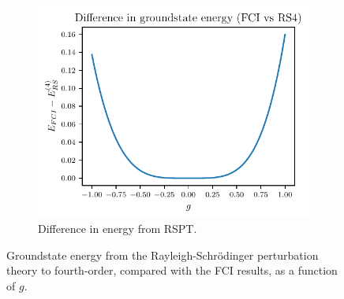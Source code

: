 \begin{figure}[htbp]
\begin{subfigure}[b]{0.48\textwidth}
        \includegraphics[width=\textwidth]{figures/g_groundstate_energy_diff.pdf}
        \caption{
            Difference in energy from RSPT.\label{fig:rs4_diff}
        }
    \end{subfigure}
    \caption{
        Groundstate energy from the Rayleigh-Schr\"odinger perturbation theory to fourth-order, compared with the FCI results, as a function of $g$.
    }
\end{figure}
